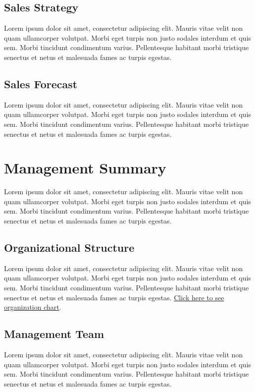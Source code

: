 \documentclass[11pt,titlepage]{article}
\begin{document}
\subsection{Sales Strategy}
Lorem ipsum dolor sit amet, consectetur adipiscing elit. Mauris vitae velit 
non quam ullamcorper volutpat. Morbi eget turpis non justo sodales interdum 
et quis sem. Morbi tincidunt condimentum varius. Pellentesque habitant morbi 
tristique senectus et netus et malesuada fames ac turpis egestas.\newline
\subsection{Sales Forecast}
Lorem ipsum dolor sit amet, consectetur adipiscing elit. Mauris vitae velit 
non quam ullamcorper volutpat. Morbi eget turpis non justo sodales interdum 
et quis sem. Morbi tincidunt condimentum varius. Pellentesque habitant morbi 
tristique senectus et netus et malesuada fames ac turpis egestas.\newline
\pagebreak

\section{Management Summary}
Lorem ipsum dolor sit amet, consectetur adipiscing elit. Mauris vitae velit 
non quam ullamcorper volutpat. Morbi eget turpis non justo sodales interdum 
et quis sem. Morbi tincidunt condimentum varius. Pellentesque habitant morbi 
tristique senectus et netus et malesuada fames ac turpis egestas.\newline
\subsection{Organizational Structure}
Lorem ipsum dolor sit amet, consectetur adipiscing elit. Mauris vitae velit 
non quam ullamcorper volutpat. Morbi eget turpis non justo sodales interdum 
et quis sem. Morbi tincidunt condimentum varius. Pellentesque habitant morbi 
tristique senectus et netus et malesuada fames ac turpis egestas.\newline
\hyperlink{ref_org_chart}{Click here to see organization chart}.
\subsection{Management Team}
Lorem ipsum dolor sit amet, consectetur adipiscing elit. Mauris vitae velit 
non quam ullamcorper volutpat. Morbi eget turpis non justo sodales interdum 
et quis sem. Morbi tincidunt condimentum varius. Pellentesque habitant morbi 
tristique senectus et netus et malesuada fames ac turpis egestas.\newline
\end{document}
